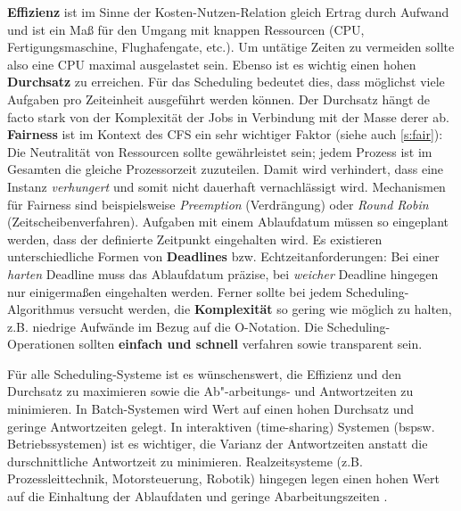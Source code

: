 \textbf{Effizienz} ist im Sinne der Kosten-Nutzen-Relation gleich Ertrag durch Aufwand und ist ein Maß für den Umgang mit knappen Ressourcen (CPU, Fertigungsmaschine, Flughafengate, etc.). Um untätige Zeiten zu vermeiden sollte also eine CPU maximal ausgelastet sein. Ebenso ist es wichtig einen hohen \textbf{Durchsatz} zu erreichen. Für das Scheduling bedeutet dies, dass möglichst viele Aufgaben pro Zeiteinheit ausgeführt werden können. Der Durchsatz hängt de facto stark von der Komplexität der Jobs in Verbindung mit der Masse derer ab. \textbf{Fairness} ist im Kontext des CFS ein sehr wichtiger Faktor (siehe auch \ref{s:fair}): Die Neutralität von Ressourcen sollte gewährleistet sein; jedem Prozess ist im Gesamten die gleiche Prozessorzeit zuzuteilen. Damit wird verhindert, dass eine Instanz \textit{verhungert} und somit nicht dauerhaft vernachlässigt wird. Mechanismen für Fairness sind beispielsweise \textit{Preemption} (Verdrängung) o\-der \textit{Round Robin} (Zeitscheibenverfahren). 
Aufgaben mit einem Ablaufdatum müssen so eingeplant werden, dass der definierte Zeitpunkt eingehalten wird. Es existieren unterschiedliche Formen von \textbf{Deadlines} bzw. Echtzeitanforderungen: Bei einer \textit{harten} Deadline muss das Ablaufdatum präzise, bei \textit{weicher} Deadline hingegen nur einigermaßen eingehalten werden. Ferner sollte bei jedem Sche\-duling-Algorithmus versucht werden, die \textbf{Komplexität} so gering wie möglich zu halten, z.B. niedrige Aufwände im Bezug auf die O-Notation. Die Scheduling-Operationen sollten \textbf{einfach und schnell} verfahren sowie transparent sein.  

Für alle Scheduling-Systeme ist es wünschenswert, die Effizienz und den Durchsatz zu maximieren sowie  die Ab"-arbeitungs- und Antwortzeiten zu minimieren. In Batch-Systemen wird Wert auf einen hohen Durchsatz und geringe Antwortzeiten gelegt. In interaktiven (time-sharing) Systemen (bspsw. Betriebssystemen) ist es wichtiger, die Varianz der Antwortzeiten anstatt die durschnittliche Antwortzeit zu minimieren. Realzeitsysteme (z.B. Prozessleittechnik, Motorsteuerung, Robotik) hingegen legen einen hohen Wert auf die Einhaltung der Ablaufdaten und geringe Abarbeitungszeiten \cite{asilberschatz}.\\


